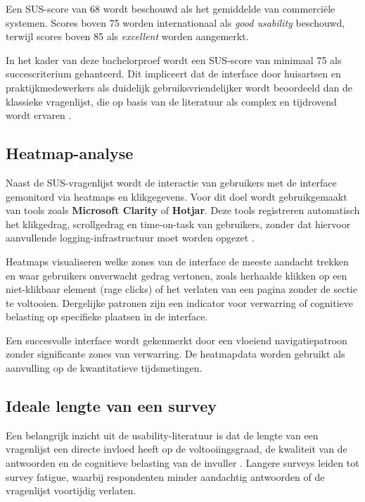 Een SUS-score van 68 wordt beschouwd als het gemiddelde van commerciële systemen. Scores
boven 75 worden internationaal als \textit{good usability} beschouwd, terwijl scores boven 85
als \textit{excellent} worden aangemerkt.
\medskip

In het kader van deze bachelorproef wordt een SUS-score van minimaal 75 als succescriterium
gehanteerd. Dit impliceert dat de interface door huisartsen en praktijkmedewerkers als
duidelijk gebruiksvriendelijker wordt beoordeeld dan de klassieke vragenlijst, die op basis van
de literatuur als complex en tijdrovend wordt ervaren \autocite{Merckx2023}.

\subsection{Heatmap-analyse}
\label{subsec:heatmap}

Naast de SUS-vragenlijst wordt de interactie van gebruikers met de interface gemonitord via
heatmaps en klikgegevens. Voor dit doel wordt gebruikgemaakt van tools zoals
\textbf{Microsoft Clarity} of \textbf{Hotjar}. Deze tools registreren automatisch het klikgedrag,
scrollgedrag en time-on-task van gebruikers, zonder dat hiervoor aanvullende
logging-infrastructuur moet worden opgezet \autocite{clarityDocs,hotjarDocs}.
\medskip

Heatmaps visualiseren welke zones van de interface de meeste aandacht trekken en waar
gebruikers onverwacht gedrag vertonen, zoals herhaalde klikken op een niet-klikbaar element
(rage clicks) of het verlaten van een pagina zonder de sectie te voltooien. Dergelijke patronen
zijn een indicator voor verwarring of cognitieve belasting op specifieke plaatsen in de
interface.
\medskip

Een succesvolle interface wordt gekenmerkt door een vloeiend navigatiepatroon zonder
significante zones van verwarring. De heatmapdata worden gebruikt als aanvulling op de kwantitatieve
tijdsmetingen.

\subsection{Ideale lengte van een survey}
\label{subsec:survey-lengte}

Een belangrijk inzicht uit de usability-literatuur is dat de lengte van een vragenlijst een
directe invloed heeft op de voltooiingsgraad, de kwaliteit van de antwoorden en de
cognitieve belasting van de invuller \autocite{Kost2018}. Langere surveys leiden tot
survey fatigue, waarbij respondenten minder aandachtig antwoorden of de vragenlijst
voortijdig verlaten.
\medskip

